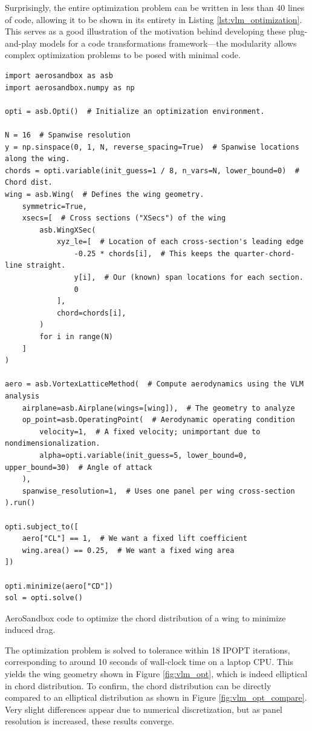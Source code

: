 Surprisingly, the entire optimization problem can be written in less than 40 lines of code, allowing it to be shown in its entirety in Listing \ref{lst:vlm_optimization}. This serves as a good illustration of the motivation behind developing these plug-and-play models for a code transformations framework—the modularity allows complex optimization problems to be posed with minimal code.

\begin{listing}[H]
    \begin{verbatim}
import aerosandbox as asb
import aerosandbox.numpy as np

opti = asb.Opti()  # Initialize an optimization environment.

N = 16  # Spanwise resolution
y = np.sinspace(0, 1, N, reverse_spacing=True)  # Spanwise locations along the wing.
chords = opti.variable(init_guess=1 / 8, n_vars=N, lower_bound=0)  # Chord dist.
wing = asb.Wing(  # Defines the wing geometry.
    symmetric=True,
    xsecs=[  # Cross sections ("XSecs") of the wing
        asb.WingXSec(
            xyz_le=[  # Location of each cross-section's leading edge
                -0.25 * chords[i],  # This keeps the quarter-chord-line straight.
                y[i],  # Our (known) span locations for each section.
                0
            ],
            chord=chords[i],
        )
        for i in range(N)
    ]
)

aero = asb.VortexLatticeMethod(  # Compute aerodynamics using the VLM analysis
    airplane=asb.Airplane(wings=[wing]),  # The geometry to analyze
    op_point=asb.OperatingPoint(  # Aerodynamic operating condition
        velocity=1,  # A fixed velocity; unimportant due to nondimensionalization.
        alpha=opti.variable(init_guess=5, lower_bound=0, upper_bound=30)  # Angle of attack
    ),
    spanwise_resolution=1,  # Uses one panel per wing cross-section
).run()

opti.subject_to([
    aero["CL"] == 1,  # We want a fixed lift coefficient
    wing.area() == 0.25,  # We want a fixed wing area
])

opti.minimize(aero["CD"])
sol = opti.solve()
    \end{verbatim}
    \caption{AeroSandbox code to optimize the chord distribution of a wing to minimize induced drag.}
    \label{lst:vlm_optimization}
\end{listing}

The optimization problem is solved to tolerance within 18 IPOPT iterations, corresponding to around 10 seconds of wall-clock time on a laptop CPU. This yields the wing geometry shown in Figure \ref{fig:vlm_opt}, which is indeed elliptical in chord distribution. To confirm, the chord distribution can be directly compared to an elliptical distribution as shown in Figure \ref{fig:vlm_opt_compare}. Very slight differences appear due to numerical discretization, but as panel resolution is increased, these results converge.

